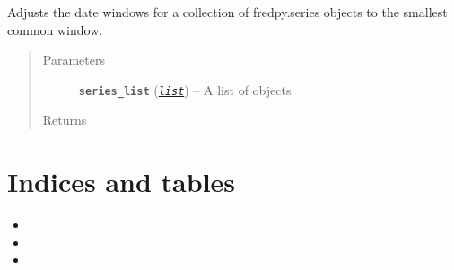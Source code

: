 \documentclass[letterpaper,10pt,english]{sphinxmanual}
\begin{document}

\begin{fulllineitems}
\label{additional_functions:fredpy.window_equalize}
Adjusts the date windows for a collection of fredpy.series objects to the smallest common window.
\begin{quote}\begin{description}
\item[{Parameters}] \leavevmode
\textbf{\texttt{series\_list}} (\href{https://docs.python.org/2/library/functions.html\#list}{\emph{\texttt{list}}}) -- A list of {\hyperref[series_class:fredpy.series]{}} objects

\item[{Returns}] \leavevmode


\end{description}\end{quote}

\end{fulllineitems}



\chapter{Indices and tables}
\label{index:indices-and-tables}\begin{itemize}
\item {} 

\item {} 

\item {} 

\end{itemize}



\renewcommand{\indexname}{Index}
\printindex
\end{document}
